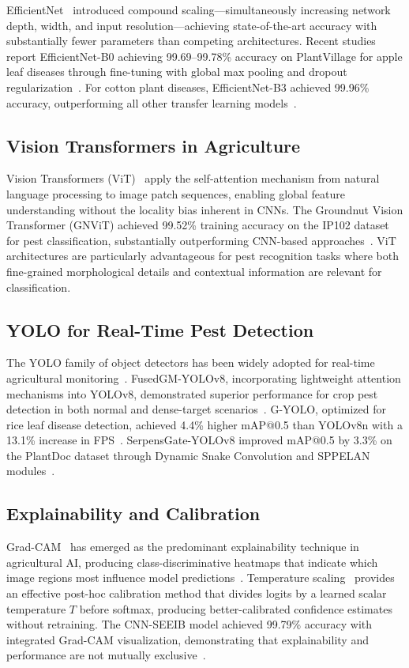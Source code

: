 \documentclass[conference]{IEEEtran}
\begin{document}
EfficientNet~\cite{tan2019efficientnet} introduced compound scaling—simultaneously increasing network depth, width, and input resolution—achieving state-of-the-art accuracy with substantially fewer parameters than competing architectures. Recent studies report EfficientNet-B0 achieving 99.69--99.78\% accuracy on PlantVillage for apple leaf diseases through fine-tuning with global max pooling and dropout regularization~\cite{efficientnet_apple2024}. For cotton plant diseases, EfficientNet-B3 achieved 99.96\% accuracy, outperforming all other transfer learning models~\cite{frontiers2024cotton}.

\subsection{Vision Transformers in Agriculture}
Vision Transformers (ViT)~\cite{dosovitskiy2021vit} apply the self-attention mechanism from natural language processing to image patch sequences, enabling global feature understanding without the locality bias inherent in CNNs. The Groundnut Vision Transformer (GNViT) achieved 99.52\% training accuracy on the IP102 dataset for pest classification, substantially outperforming CNN-based approaches~\cite{gnvit2024, gnvit_plos2024}. ViT architectures are particularly advantageous for pest recognition tasks where both fine-grained morphological details and contextual information are relevant for classification.

\subsection{YOLO for Real-Time Pest Detection}
The YOLO family of object detectors has been widely adopted for real-time agricultural monitoring~\cite{ultralytics2024}. FusedGM-YOLOv8, incorporating lightweight attention mechanisms into YOLOv8, demonstrated superior performance for crop pest detection in both normal and dense-target scenarios~\cite{fusedgm2025}. G-YOLO, optimized for rice leaf disease detection, achieved 4.4\% higher mAP@0.5 than YOLOv8n with a 13.1\% increase in FPS~\cite{gyolo2025}. SerpensGate-YOLOv8 improved mAP@0.5 by 3.3\% on the PlantDoc dataset through Dynamic Snake Convolution and SPPELAN modules~\cite{serpensgate2024}.

\subsection{Explainability and Calibration}
Grad-CAM~\cite{selvaraju2017gradcam} has emerged as the predominant explainability technique in agricultural AI, producing class-discriminative heatmaps that indicate which image regions most influence model predictions~\cite{gradcam_corn2025, xse_tomatonet2025}. Temperature scaling~\cite{guo2017calibration} provides an effective post-hoc calibration method that divides logits by a learned scalar temperature $T$ before softmax, producing better-calibrated confidence estimates without retraining. The CNN-SEEIB model achieved 99.79\% accuracy with integrated Grad-CAM visualization, demonstrating that explainability and performance are not mutually exclusive~\cite{cnnseeib2025}.
\end{document}
